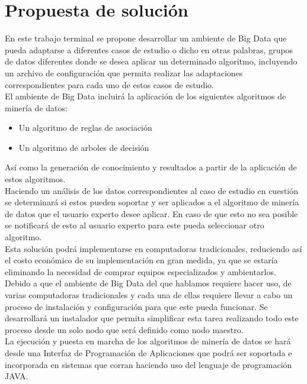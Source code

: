 \section{Propuesta de solución}
En este trabajo terminal se propone desarrollar un ambiente de Big Data que pueda adaptarse a diferentes casos de estudio o dicho en otras palabras, grupos de datos diferentes donde se desea aplicar un determinado algoritmo, incluyendo un archivo de configuración que permita realizar las adaptaciones correspondientes para cada uno de estos casos de estudio.
\\
El ambiente de Big Data incluirá la aplicación de los siguientes algoritmos de minería de datos: \\
\begin{itemize}
	\item Un algoritmo de reglas de asociación \\
	\item Un algoritmo de arboles de decisión \\
\end{itemize}
Así como la generación de conocimiento y resultados a partir de la aplicación de estos algoritmos.
\\
Haciendo un análisis de los datos correspondientes al caso de estudio en cuestión se determinará si estos pueden soportar y ser aplicados a el algoritmo de minería de datos que el usuario experto desee aplicar. En caso de que esto no sea posible se notificará de esto al usuario experto para este pueda seleccionar otro algoritmo.
\\
Esta solución podrá implementarse en computadoras tradicionales, reduciendo así el costo económico de su implementación en gran medida, ya que se estaría eliminando la necesidad de comprar equipos especializados y ambientarlos.
\\
Debido a que el ambiente de Big Data del que hablamos requiere hacer uso, de varias computadoras tradicionales y cada una de ellas requiere llevar a cabo un proceso de instalación y configuración para que este pueda funcionar. Se desarrollará un instalador que permita simplificar esta tarea realizando todo este proceso desde un solo nodo que será definido como nodo maestro.  
\\
La ejecución y puesta en marcha de los algoritmos de minería de datos se hará desde una Interfaz de Programación de Aplicaciones que podrá ser soportada e incorporada en sistemas que corran haciendo uso del lenguaje de programación JAVA. 
\\